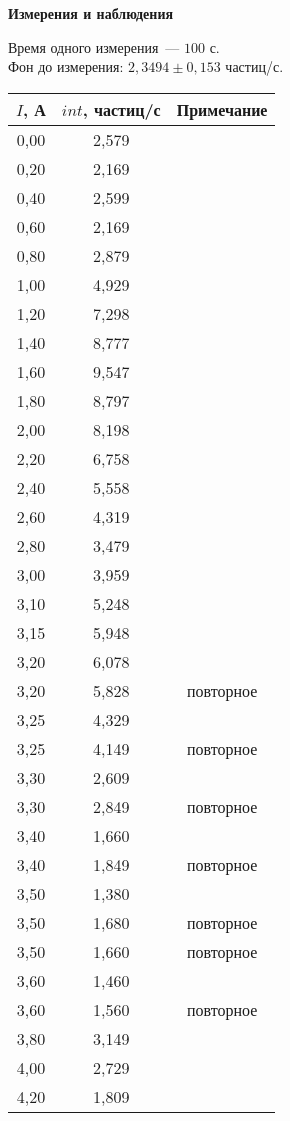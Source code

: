 \documentclass[12pt]{article}
\begin{document}
\begin{center}
    \textbf{Измерения и наблюдения}
\end{center}
Время одного измерения~--- $100$ с.
\\
Фон до измерения: $2,3494 \pm 0,153$ частиц/с.
\\
\begin{center}
    \begin{tabular}{|c|c|c|}
      \hline
 $I$, А & $int$, частиц/с & Примечание \\ \hline
0,00 & 2,579 &  \\ \hline
0,20 & 2,169 &  \\ \hline
0,40 & 2,599 &  \\ \hline
0,60 & 2,169 &  \\ \hline
0,80 & 2,879 &  \\ \hline
1,00 & 4,929 &  \\ \hline
1,20 & 7,298 &  \\ \hline
1,40 & 8,777 &  \\ \hline
1,60 & 9,547 &  \\ \hline
1,80 & 8,797 &  \\ \hline
2,00 & 8,198 &  \\ \hline
2,20 & 6,758 &  \\ \hline
2,40 & 5,558 &  \\ \hline
2,60 & 4,319 &  \\ \hline
2,80 & 3,479 &  \\ \hline
3,00 & 3,959 &  \\ \hline
3,10 & 5,248 &  \\ \hline
3,15 & 5,948 &  \\ \hline
3,20 & 6,078 &  \\ \hline
3,20 & 5,828 & повторное \\ \hline
3,25 & 4,329 &  \\ \hline
3,25 & 4,149 & повторное \\ \hline
3,30 & 2,609 &  \\ \hline
3,30 & 2,849 & повторное \\ \hline
3,40 & 1,660 &  \\ \hline
3,40 & 1,849 & повторное \\ \hline
3,50 & 1,380 &  \\ \hline
3,50 & 1,680 & повторное \\ \hline
3,50 & 1,660 & повторное \\ \hline
3,60 & 1,460 &  \\ \hline
3,60 & 1,560 & повторное \\ \hline
3,80 & 3,149 &  \\ \hline
4,00 & 2,729 &  \\ \hline
4,20 & 1,809 &  \\ \hline
   \end{tabular}
\end{center}
\end{document}
